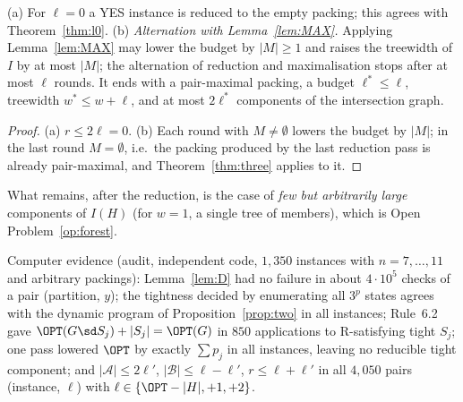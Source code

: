 \begin{corollary}\label{cor:three}
(a) For $\ell=0$ a YES instance is reduced to the empty packing; this agrees with Theorem~\ref{thm:l0}.
(b) \emph{Alternation with Lemma~\ref{lem:MAX}.} Applying Lemma~\ref{lem:MAX} may lower the budget by $|M|\ge1$ and raises the treewidth of $I$ by at most $|M|$; the alternation of reduction and maximalisation stops after at most $\ell$ rounds. It ends with a pair-maximal packing, a budget $\ell^*\le\ell$, treewidth $w^*\le w+\ell$, and at most $2\ell^*$ components of the intersection graph.
\end{corollary}
\begin{proof}
(a) $r\le2\ell=0$. (b) Each round with $M\ne\emptyset$ lowers the budget by $|M|$; in the last round $M=\emptyset$, i.e.\ the packing produced by the last reduction pass is already pair-maximal, and Theorem~\ref{thm:three} applies to it.
\end{proof}
What remains, after the reduction, is the case of \emph{few but arbitrarily large} components of $I(H)$ (for $w=1$, a single tree of members), which is Open Problem~\ref{op:forest}.

Computer evidence (audit, independent code, $1{,}350$ instances with $n=7,\dots,11$ and arbitrary packings): Lemma~\ref{lem:D} had no failure in about $4\cdot10^5$ checks of a pair (partition, $y$); the tightness decided by enumerating all $3^p$ states agrees with the dynamic program of Proposition~\ref{prop:two} in all instances; Rule~6.2 gave $\OPT(G\sd S_j)+|S_j|=\OPT(G)$ in $850$ applications to R-satisfying tight $S_j$; one pass lowered $\OPT$ by exactly $\sum p_j$ in all instances, leaving no reducible tight component; and $|\mathcal A|\le2\ell'$, $|\mathcal B|\le\ell-\ell'$, $r\le\ell+\ell'$ in all $4{,}050$ pairs (instance, $\ell$) with $\ell\in\{\OPT-|H|,+1,+2\}$.

